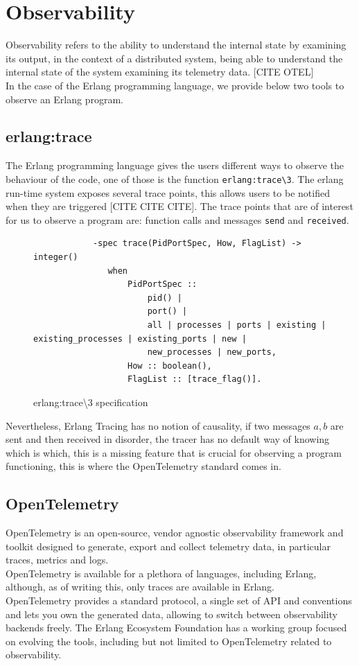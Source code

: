 \section{Observability}
        Observability refers to the ability to understand the internal state by examining its output, in the context of a distributed system, being able to understand the internal state of the system examining its telemetry data. [CITE OTEL] \\
    In the case of the Erlang programming language, we provide below two tools to observe an Erlang program.
    \subsection{erlang:trace}
        The Erlang programming language gives the users different ways to observe the behaviour of the code, one of those is the function \texttt{erlang:trace\textbackslash 3}. The erlang run-time system exposes several trace points, this allows users to be notified when they are triggered [CITE CITE CITE]. The trace points that are of interest for us to observe a program are: function calls and messages \texttt{send} and \texttt{received}. \\
        \begin{figure}[!ht]
        \centering
        \begin{verbatim}
            -spec trace(PidPortSpec, How, FlagList) -> integer()
               when
                   PidPortSpec ::
                       pid() |
                       port() |
                       all | processes | ports | existing | existing_processes | existing_ports | new |
                       new_processes | new_ports,
                   How :: boolean(),
                   FlagList :: [trace_flag()].
        \end{verbatim}
        \caption{erlang:trace\textbackslash3 specification}
\end{figure}

    Nevertheless, Erlang Tracing has no notion of causality, if two messages $a, b$ are sent and then received in disorder, the tracer has no default way of knowing which is which, this is a missing feature that is crucial for observing a program functioning, this is where the OpenTelemetry standard comes in.

\subsection{OpenTelemetry}
    OpenTelemetry is an open-source, vendor agnostic observability framework and toolkit designed to generate, export and collect telemetry data, in particular traces, metrics and logs. \\ 
    OpenTelemetry is available for a plethora of languages, including Erlang, although, as of writing this, only traces are available in Erlang. \\
    OpenTelemetry provides a standard protocol, a single set of API and conventions and lets you own the generated data, allowing to switch between observability backends freely.
    The Erlang Ecosystem Foundation has a working group focused on evolving the tools, including but not limited to OpenTelemetry related to observability. \\
